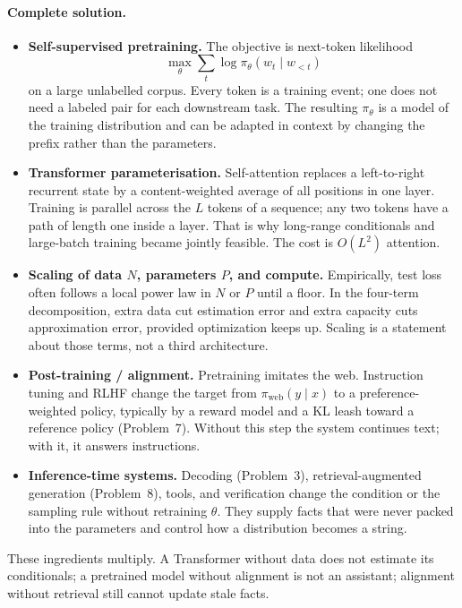 \documentclass[11pt,a4paper]{article}
\theoremstyle{definition}
\begin{document}
\paragraph{Complete solution.}
\begin{itemize}
    \item \textbf{Self-supervised pretraining.} The objective is next-token likelihood
    \[
    \max_\theta\sum_t\log\pi_\theta(w_t\mid w_{<t})
    \]
    on a large unlabelled corpus. Every token is a training event; one does not need a labeled pair for each downstream task. The resulting \(\pi_\theta\) is a model of the training distribution and can be adapted in context by changing the prefix rather than the parameters.
    \item \textbf{Transformer parameterisation.} Self-attention replaces a left-to-right recurrent state by a content-weighted average of all positions in one layer. Training is parallel across the \(L\) tokens of a sequence; any two tokens have a path of length one inside a layer. That is why long-range conditionals and large-batch training became jointly feasible. The cost is \(O(L^2)\) attention.
    \item \textbf{Scaling of data \(N\), parameters \(P\), and compute.} Empirically, test loss often follows a local power law in \(N\) or \(P\) until a floor. In the four-term decomposition, extra data cut estimation error and extra capacity cuts approximation error, provided optimization keeps up. Scaling is a statement about those terms, not a third architecture.
    \item \textbf{Post-training / alignment.} Pretraining imitates the web. Instruction tuning and RLHF change the target from \(\pi_{\mathrm{web}}(y\mid x)\) to a preference-weighted policy, typically by a reward model and a KL leash toward a reference policy (Problem~7). Without this step the system continues text; with it, it answers instructions.
    \item \textbf{Inference-time systems.} Decoding (Problem~3), retrieval-augmented generation (Problem~8), tools, and verification change the condition or the sampling rule without retraining \(\theta\). They supply facts that were never packed into the parameters and control how a distribution becomes a string.
\end{itemize}

These ingredients multiply. A Transformer without data does not estimate its conditionals; a pretrained model without alignment is not an assistant; alignment without retrieval still cannot update stale facts.
\end{document}
